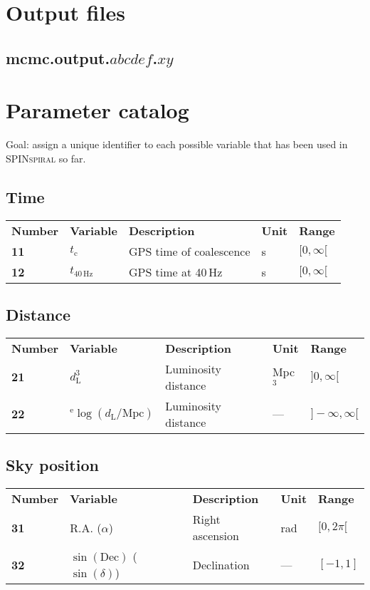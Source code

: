 \documentclass[10pt]{article}
\begin{document}
\pagebreak
\section{Output files}

\subsection{mcmc.output.$abcdef$.$xy$}





\pagebreak
\section{Parameter catalog}
\label{sec:parameter_catalog}
Goal: assign a unique identifier to each possible variable that has been used in \textsc{SPINspiral} so far.

\subsection{Time}
\begin{tabular}{lllll}
  \textbf{Number} & \textbf{Variable} & \textbf{Description} & \textbf{Unit} & \textbf{Range} \\
  \textbf{11} & $t_\mathrm{c}$        & GPS time of coalescence & s & $[0,\infty[$ \\
  \textbf{12} & $t_\mathrm{40\,Hz}$   & GPS time at 40\,Hz & s & $[0,\infty[$ \\
\end{tabular}

\subsection{Distance}
\begin{tabular}{lllll}
  \textbf{Number} & \textbf{Variable} & \textbf{Description} & \textbf{Unit} & \textbf{Range} \\
  \textbf{21} & $d_\mathrm{L}^3$ & Luminosity distance & Mpc$^3$ & $]0,\infty[$ \\
  \textbf{22} & $^\mathrm{e}\log(d_\mathrm{L}/\mathrm{Mpc})$ & Luminosity distance & --- & $]-\infty,\infty[$ \\
\end{tabular}

\subsection{Sky position}
\begin{tabular}{lllll}
  \textbf{Number} & \textbf{Variable} & \textbf{Description} & \textbf{Unit} & \textbf{Range} \\
  \textbf{31} & R.A. ($\alpha$)  & Right ascension & rad & $[0,2\pi[$ \\
  \textbf{32} & $\sin(\mathrm{Dec})$ ($\sin(\delta)$)  & Declination & --- & $[-1,1]$ \\
\end{tabular}
\end{document}
